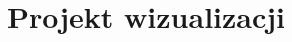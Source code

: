\documentclass[xcolor=dvipsnames,9pt]{beamer}
\begin{document}


\section{Projekt wizualizacji}
\end{document}
